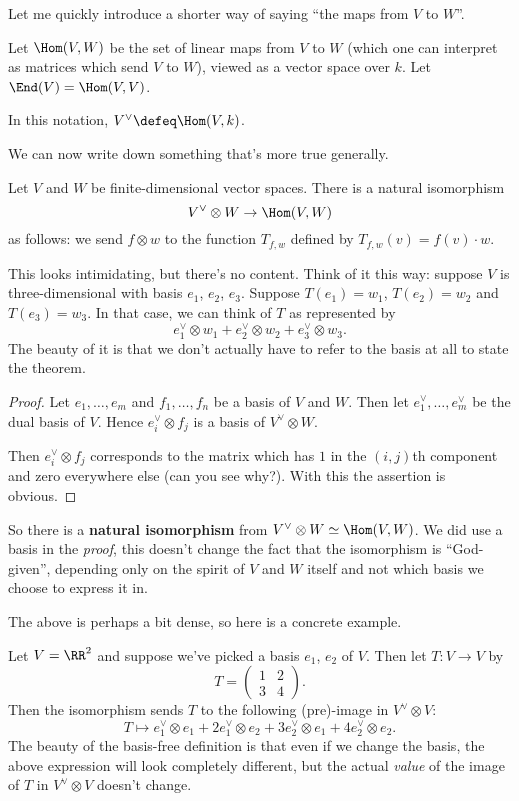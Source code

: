 Let me quickly introduce a shorter way of saying ``the maps from $V$ to $W$''.
\begin{definition}
	Let $\Hom(V,W)$ be the set of linear maps from $V$ to $W$
	(which one can interpret as matrices which send $V$ to $W$),
	viewed as a vector space over $k$.
	Let $\End(V) = \Hom(V,V)$.
\end{definition}
In this notation, $V^\vee \defeq \Hom(V,k)$.

We can now write down something that's more true generally.
\begin{theorem}
	Let $V$ and $W$ be finite-dimensional vector spaces.
	There is a natural isomorphism
	\[ V^\vee \otimes W \to \Hom(V,W) \]
	as follows: we send $f \otimes w$
	to the function $T_{f,w}$ defined by $T_{f,w}(v) = f(v) \cdot w$.
\end{theorem}
This looks intimidating, but there's no content.
Think of it this way: suppose $V$ is three-dimensional with basis $e_1$,
$e_2$, $e_3$.  Suppose $T(e_1) = w_1$, $T(e_2) = w_2$ and $T(e_3) = w_3$.
In that case, we can think of $T$ as represented by
\[ e_1^\vee \otimes w_1 + e_2^\vee \otimes w_2 + e_3^\vee \otimes w_3. \]
The beauty of it is that we don't actually have to refer to the basis at all
to state the theorem.
\begin{proof}
	Let $e_1, \dots, e_m$ and $f_1, \dots, f_n$ be a basis of $V$ and $W$.
	Then let $e_1^\vee, \dots, e_m^\vee$ be the dual basis of $V$.
	Hence $e_i^\vee \otimes f_j$ is a basis of $V^\vee \otimes W$.

	Then $e_i^\vee \otimes f_j$ corresponds to the matrix
	which has $1$ in the $(i,j)$th component and zero everywhere else
	(can you see why?).
	With this the assertion is obvious.
\end{proof}

So there is a \textbf{natural isomorphism} from $V^\vee \otimes W \simeq \Hom(V,W)$.
We did use a basis in the \emph{proof}, this doesn't change the 
fact that the isomorphism is ``God-given'', depending only on the spirit
of $V$ and $W$ itself and not which basis we choose to express it in.

The above is perhaps a bit dense, so here is a concrete example.
\begin{example}
	Let $V = \RR^2$ and suppose we've picked a basis $e_1$, $e_2$ of $V$.
	Then let $T : V \to V$ by
	\[ T = \left(
		\begin{array}{cc}
			1 & 2 \\ 3 & 4
		\end{array}
		\right). \]
	Then the isomorphism sends $T$ to the following (pre)-image in
	$V^\vee \otimes V$:
	\[ T \mapsto e_1^\vee \otimes e_1 + 2e_1^\vee \otimes e_2
		+ 3e_2^\vee \otimes e_1 + 4e_2^\vee \otimes e_2. \]
	The beauty of the basis-free definition is that even if we change the basis,
	the above expression will look completely different, but
	the actual \emph{value} of the image of $T$ in $V^\vee \otimes V$ doesn't change.
\end{example}


